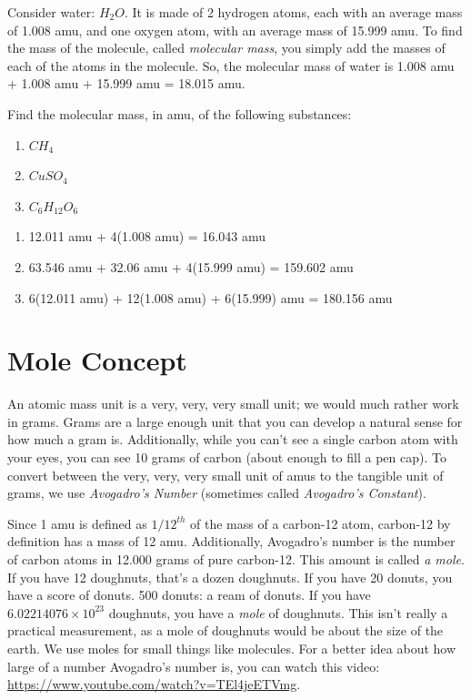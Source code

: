 Consider water: $H_2 O$. It is made of 2 hydrogen atoms, each with an average 
mass of 1.008 amu, and one oxygen atom, with an average mass of 15.999 amu. To 
find the mass of the molecule, called \textit{molecular mass}, you simply add the 
masses of each of the atoms in the molecule. So, the molecular mass of water is 
1.008 amu + 1.008 amu + 15.999 amu = 18.015 amu. 

\begin{Exercise}[title = {Determining Molecular Mass}, label = molecular]
Find the molecular mass, in amu, of the following substances:
\begin{enumerate}
\item $CH_4$
\item $CuSO_4$
\item $C_6H_{12}O_6$
\end{enumerate}
\end{Exercise} 

\begin{Answer}[ref = molecular]
\begin{enumerate}
\item 12.011 amu + 4(1.008 amu) = 16.043 amu
\item 63.546 amu + 32.06 amu + 4(15.999 amu) = 159.602 amu
\item 6(12.011 amu) + 12(1.008 amu) + 6(15.999) amu = 180.156 amu
\end{enumerate}
\end{Answer}

\section{Mole Concept}

An atomic mass unit is a very, very, very small unit; we would much rather work in
grams. Grams are a large enough unit that you can develop a natural sense for how 
much a gram is. Additionally, while you can't see a single carbon atom with your 
eyes, you can see 10 grams of carbon (about enough to fill a pen cap). To convert
between the very, very, very small unit of amus to the tangible unit of grams, we 
use \textit{Avogadro's Number} (sometimes called \textit{Avogadro's Constant}).

Since 1 amu is defined as $1/12^{th}$ of the mass of a carbon-12 atom, carbon-12 
by definition has a mass of 12 amu. Additionally, Avogadro's number is the number 
of carbon atoms in 12.000 grams of pure carbon-12. This amount is called \textit{a
mole}. If you have 12 doughnuts, that's a dozen doughnuts. If you have 20 donuts, 
you have a score of donuts. 500 donuts: a ream of donuts. If you have $6.02214076 
\times 10^{23}$ doughnuts, you have a \textit{mole} of doughnuts. This isn't 
really a practical measurement, as a mole of doughnuts would be about the size of 
the earth. We use moles for small things like molecules. For a better 
idea about how large of a number Avogadro's number is, you can watch this video: 
\url{https://www.youtube.com/watch?v=TEl4jeETVmg}. 

